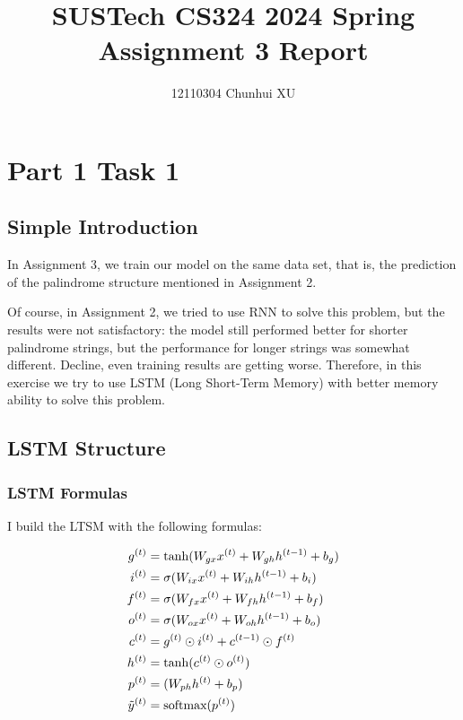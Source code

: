 \documentclass{article}
\title{SUSTech CS324 2024 Spring Assignment 3 Report}
\author{12110304 Chunhui XU}
\begin{document}
\maketitle

\section{Part 1 Task 1}

\subsection{Simple Introduction}

In Assignment 3, we train our model on the same data set, that is, the prediction of the palindrome structure mentioned in Assignment 2.

Of course, in Assignment 2, we tried to use RNN to solve this problem, but the results were not satisfactory: the model still performed better for shorter palindrome strings, but the performance for longer strings was somewhat different. Decline, even training results are getting worse. Therefore, in this exercise we try to use LSTM (Long Short-Term Memory) \cite{HochSchm97} with better memory ability to solve this problem.

\subsection{LSTM Structure}

\subsubsection{LSTM Formulas}

I build the LTSM with the following formulas:

\begin{align}
    g^{(t)} &= \tanh(W_{gx}x^{(t)} + W_{gh}h^{(t-1)} + b_{g})\\
    i^{(t)} &= \sigma(W_{ix}x^{(t)} + W_{ih}h^{(t-1)} + b_{i})\\
    f^{(t)} &= \sigma(W_{fx}x^{(t)} + W_{fh}h^{(t-1)} + b_{f})\\
    o^{(t)} &= \sigma(W_{ox}x^{(t)} + W_{oh}h^{(t-1)} + b_{o})\\
    c^{(t)} &= g^{(t)} \odot i^{(t)} + c^{(t-1)} \odot f^{(t)}\\
    h^{(t)} &= \tanh(c^{(t)} \odot o^{(t)})\\
    p^{(t)} &= (W_{ph}h^{(t)} + b_{p})\\
    \Tilde{y}^{(t)} &= \text{softmax}(p^{(t)})
\end{align}
\end{document}
